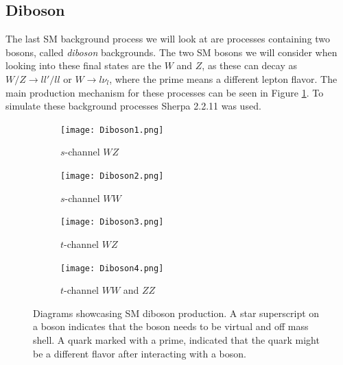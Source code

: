 \documentclass[12pt, a4paper]{book}
\begin{document}
\subsection{Diboson}
The last SM background process we will look at are processes containing two bosons, called \textit{diboson} backgrounds. The two SM bosons we will consider when looking into these final states are the $W$ and $Z$, as these can decay as $W/Z\rightarrow ll'/ll$ 
or $W\rightarrow l\nu_l$, where the prime means a different lepton flavor. The main production mechanism for these processes can be seen in Figure \ref{fig:Diboson_BKG}. To simulate these background processes Sherpa 2.2.11 \cite{Sherpa} was used.
\begin{figure}[!ht]
    \centering 
    \begin{subfigure}[b]{0.4\textwidth}
        \centering
        \texttt{[image: Diboson1.png]}
        \caption{$s$-channel $WZ$}
    \end{subfigure}
    \hfill
    \begin{subfigure}[b]{0.4\textwidth}
        \centering
        \texttt{[image: Diboson2.png]}
        \caption{$s$-channel $WW$}
    \end{subfigure}
    \hfill
    \begin{subfigure}[b]{0.4\textwidth}
        \centering
        \texttt{[image: Diboson3.png]}
        \caption{$t$-channel $WZ$}
    \end{subfigure}
    \hfill
    \begin{subfigure}[b]{0.4\textwidth}
        \centering
        \texttt{[image: Diboson4.png]}
        \caption{$t$-channel $WW$ and $ZZ$}
    \end{subfigure}
    \caption[Diboson production]{Diagrams showcasing SM diboson production. A star superscript on a boson indicates that the boson needs to be virtual and off mass shell.  A quark marked with a prime, indicated that the quark might be a different flavor after interacting with a boson. }\label{fig:Diboson_BKG}
\end{figure}
\end{document}
